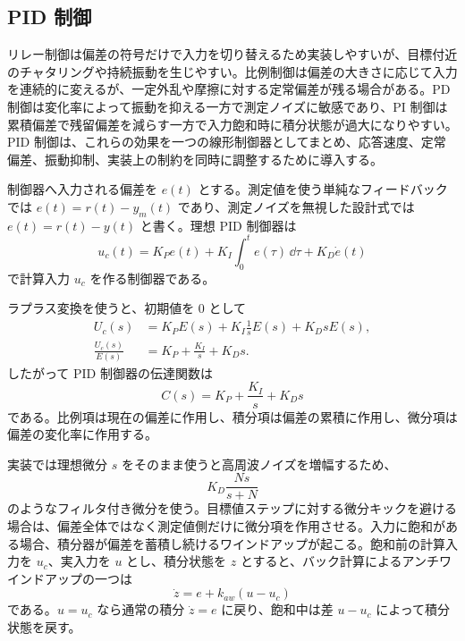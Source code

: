 \subsection{PID 制御}

リレー制御は偏差の符号だけで入力を切り替えるため実装しやすいが、目標付近のチャタリングや持続振動を生じやすい。比例制御は偏差の大きさに応じて入力を連続的に変えるが、一定外乱や摩擦に対する定常偏差が残る場合がある。PD 制御は変化率によって振動を抑える一方で測定ノイズに敏感であり、PI 制御は累積偏差で残留偏差を減らす一方で入力飽和時に積分状態が過大になりやすい。PID 制御は、これらの効果を一つの線形制御器としてまとめ、応答速度、定常偏差、振動抑制、実装上の制約を同時に調整するために導入する。

\begin{definition}
制御器へ入力される偏差を $e(t)$ とする。測定値を使う単純なフィードバックでは $e(t)=r(t)-y_m(t)$ であり、測定ノイズを無視した設計式では $e(t)=r(t)-y(t)$ と書く。理想 PID 制御器は
\begin{equation}
  u_c(t)=K_P e(t)+K_I\int_0^t e(\tau)\,\dd\tau+K_D\dot{e}(t)
  \label{eq:pid-time}
\end{equation}
で計算入力 $u_c$ を作る制御器である。
\end{definition}

ラプラス変換を使うと、初期値を 0 として
\begin{align}
  U_c(s)&=K_P E(s)+K_I\frac{1}{s}E(s)+K_DsE(s),\\
  \frac{U_c(s)}{E(s)}&=K_P+\frac{K_I}{s}+K_Ds.
\end{align}
したがって PID 制御器の伝達関数は
\begin{equation}
  C(s)=K_P+\frac{K_I}{s}+K_Ds
\end{equation}
である。比例項は現在の偏差に作用し、積分項は偏差の累積に作用し、微分項は偏差の変化率に作用する。

実装では理想微分 $s$ をそのまま使うと高周波ノイズを増幅するため、
\begin{equation}
  K_D\frac{Ns}{s+N}
\end{equation}
のようなフィルタ付き微分を使う。目標値ステップに対する微分キックを避ける場合は、偏差全体ではなく測定値側だけに微分項を作用させる。入力に飽和がある場合、積分器が偏差を蓄積し続けるワインドアップが起こる。飽和前の計算入力を $u_c$、実入力を $u$ とし、積分状態を $z$ とすると、バック計算によるアンチワインドアップの一つは
\begin{equation}
  \dot{z}=e+k_{aw}(u-u_c)
\end{equation}
である。$u=u_c$ なら通常の積分 $\dot{z}=e$ に戻り、飽和中は差 $u-u_c$ によって積分状態を戻す。
